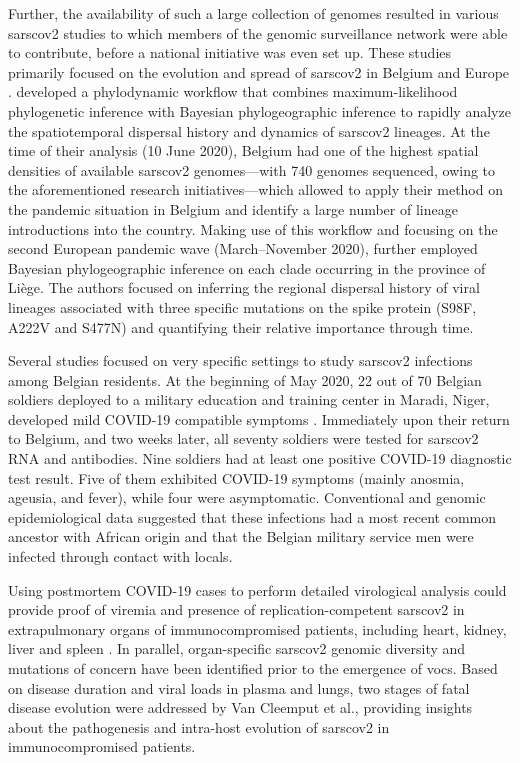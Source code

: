 Further, the availability of such a large collection of genomes resulted in various \gls{sarscov2} studies to which members of the genomic surveillance network were able to contribute, before a national initiative was even set up.
These studies primarily focused on the evolution and spread of \gls{sarscov2} in Belgium and Europe \citep{alm2020geographical}.
\citet{dellicour2021phylodynamic} developed a phylodynamic workflow that combines maximum-likelihood phylogenetic inference with Bayesian phylogeographic inference to rapidly analyze the spatiotemporal dispersal history and dynamics of \gls{sarscov2} lineages.
At the time of their analysis (10 June 2020), Belgium had one of the highest spatial densities of available \gls{sarscov2} genomes—with 740 genomes sequenced, owing to the aforementioned research initiatives—which allowed \citet{dellicour2021phylodynamic} to apply their method on the pandemic situation in Belgium and identify a large number of lineage introductions into the country.
Making use of this workflow and focusing on the second European pandemic wave (March--November 2020), \citet{bollen2021exploiting} further employed Bayesian phylogeographic inference on each clade occurring in the province of Li\`{e}ge.
The authors focused on inferring the regional dispersal history of viral lineages associated with three specific mutations on the spike protein (S98F, A222V and S477N) and quantifying their relative importance through time.

Several studies focused on very specific settings to study \gls{sarscov2} infections among Belgian residents.
At the beginning of May 2020, 22 out of 70 Belgian soldiers deployed to a military education and training center in Maradi, Niger, developed mild COVID-19 compatible symptoms \citep{pirnay2020study}.
Immediately upon their return to Belgium, and two weeks later, all seventy soldiers were tested for \gls{sarscov2} RNA and antibodies.
Nine soldiers had at least one positive COVID-19 diagnostic test result.
Five of them exhibited COVID-19 symptoms (mainly anosmia, ageusia, and fever), while four were asymptomatic.
Conventional and genomic epidemiological data suggested that these infections had a most recent common ancestor with African origin and that the Belgian military service men were infected through contact with locals.

Using postmortem COVID-19 cases to perform detailed virological analysis could provide proof of viremia and presence of replication-competent \gls{sarscov2} in extrapulmonary organs of immunocompromised patients, including heart, kidney, liver and spleen \citep{vancleemput2021organ-specific}.
In parallel, organ-specific \gls{sarscov2} genomic diversity and mutations of concern have been identified prior to the emergence of \gls{voc}s.
Based on disease duration and viral loads in plasma and lungs, two stages of fatal disease evolution were addressed by Van Cleemput et al., providing insights about the pathogenesis and intra-host evolution of \gls{sarscov2} in immunocompromised patients.

